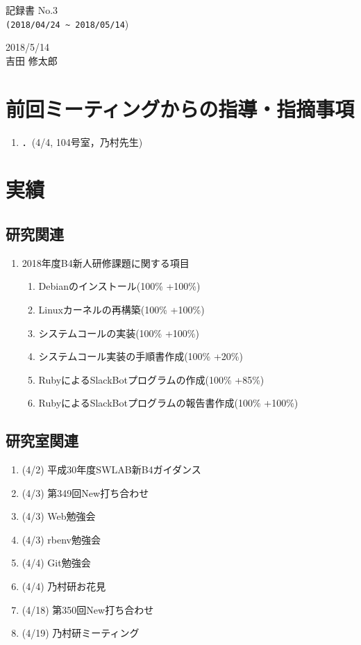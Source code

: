 \documentclass[12pt]{jsarticle}
\begin{document}
\begin{center}
  {\LARGE 記録書 No.3}\\
  {\verb|(2018/04/24 ~ 2018/05/14|)}
\end{center}

\begin{flushright}
  2018/5/14\\
  吉田 修太郎 
\end{flushright}
\section{前回ミーティングからの指導・指摘事項}
\label{sec:introduction}
\begin{enumerate}
\item ．(4/4, 104号室，乃村先生)
\end{enumerate}

\section{実績}\label{jisseki}
\subsection{研究関連}\label{kenkyuu}
\begin{enumerate}
\item 2018年度B4新人研修課題に関する項目
  \begin{enumerate}
  \item Debianのインストール(100\% +100\%)
  \item Linuxカーネルの再構築(100\% +100\%)
  \item システムコールの実装(100\% +100\%)
  \item システムコール実装の手順書作成(100\% +20\%)
  \item RubyによるSlackBotプログラムの作成(100\% +85\%)
  \item RubyによるSlackBotプログラムの報告書作成(100\% +100\%)
  \end{enumerate}
  
\end{enumerate}
\subsection{研究室関連}\label{kenkyuushitu}
\begin{enumerate}
\item (4/2) 平成30年度SWLAB新B4ガイダンス
\item (4/3) 第349回New打ち合わせ
\item (4/3) Web勉強会
\item (4/3) rbenv勉強会
\item (4/4) Git勉強会
\item (4/4) 乃村研お花見
\item (4/18) 第350回New打ち合わせ
\item (4/19) 乃村研ミーティング
\end{enumerate}
\end{document}
